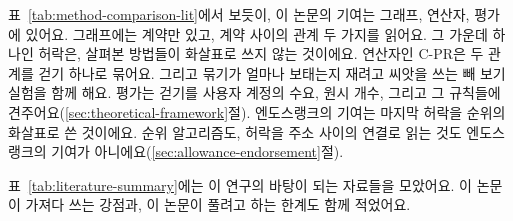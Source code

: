 표~\ref{tab:method-comparison-lit}에서 보듯이, 이 논문의 기여는 그래프, 연산자, 평가에 있어요. 그래프에는 계약만 있고, 계약 사이의 관계 두 가지를 읽어요. 그 가운데 하나인 허락은, 살펴본 방법들이 화살표로 쓰지 않는 것이에요. 연산자인 \mbox{C-PR}은 두 관계를 걷기 하나로 묶어요. 그리고 묶기가 얼마나 보태는지 재려고 씨앗을 쓰는 빼 보기 실험을 함께 해요. 평가는 걷기를 사용자 계정의 수요, 원시 개수, 그리고 그 규칙들에 견주어요(\ref{sec:theoretical-framework}절). 엔도스랭크의 기여는 마지막 허락을 순위의 화살표로 쓴 것이에요. 순위 알고리즘도, 허락을 주소 사이의 연결로 읽는 것도 엔도스랭크의 기여가 아니에요(\ref{sec:allowance-endorsement}절).


표~\ref{tab:literature-summary}에는 이 연구의 바탕이 되는 자료들을 모았어요. 이 논문이 가져다 쓰는 강점과, 이 논문이 풀려고 하는 한계도 함께 적었어요.

